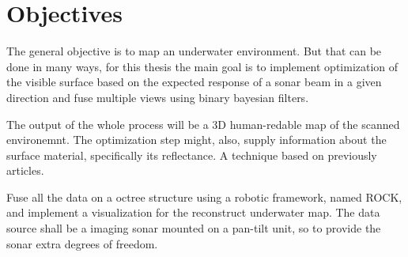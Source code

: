 

\section{Objectives}


The general objective is to map an underwater environment.
But that can be done in many ways, for this thesis the main goal is to implement
optimization of the visible surface based on the expected response of a
sonar beam in a given direction and fuse multiple views using binary bayesian
filters. 

The output of the whole process will be a 3D human-redable map of the scanned
environemnt. The optimization step might, also, supply information about the
surface material, specifically its reflectance. A technique based on previously
articles.

 Fuse all the data on a octree structure using a robotic framework,
named ROCK, and implement a visualization for the reconstruct underwater map.
The data source shall be a imaging sonar mounted on a pan-tilt unit, so to
provide the sonar extra degrees of freedom.

